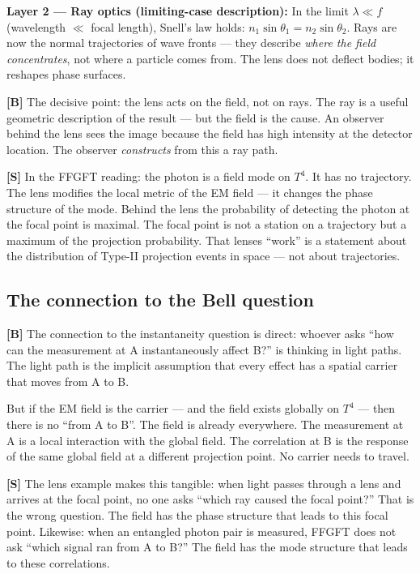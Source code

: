 \textbf{Layer 2 --- Ray optics (limiting-case description):}
In the limit $\lambda \ll f$ (wavelength $\ll$ focal length), Snell's law
holds: $n_1 \sin\theta_1 = n_2 \sin\theta_2$. Rays are now the normal
trajectories of wave fronts --- they describe \emph{where the field
concentrates}, not where a particle comes from. The lens does not deflect
bodies; it reshapes phase surfaces.

\textbf{[B]} The decisive point: the lens acts on the field, not on rays.
The ray is a useful geometric description of the result --- but the field
is the cause. An observer behind the lens sees the image because the field
has high intensity at the detector location. The observer \emph{constructs}
from this a ray path.

\textbf{[S]} In the FFGFT reading: the photon is a field mode on $T^4$.
It has no trajectory. The lens modifies the local metric of the EM field
--- it changes the phase structure of the mode. Behind the lens the
probability of detecting the photon at the focal point is maximal. The
focal point is not a station on a trajectory but a maximum of the
projection probability. That lenses ``work'' is a statement about the
distribution of Type-II projection events in space --- not about trajectories.

\subsection{The connection to the Bell question}

\textbf{[B]} The connection to the instantaneity question is direct:
whoever asks ``how can the measurement at A instantaneously affect B?''
is thinking in light paths. The light path is the implicit assumption
that every effect has a spatial carrier that moves from A to B.

But if the EM field is the carrier --- and the field exists globally on
$T^4$ --- then there is no ``from A to B''. The field is already everywhere.
The measurement at A is a local interaction with the global field. The
correlation at B is the response of the same global field at a different
projection point. No carrier needs to travel.

\textbf{[S]} The lens example makes this tangible: when light passes
through a lens and arrives at the focal point, no one asks ``which ray
caused the focal point?'' That is the wrong question. The field has the
phase structure that leads to this focal point. Likewise: when an
entangled photon pair is measured, FFGFT does not ask ``which signal
ran from A to B?'' The field has the mode structure that leads to these
correlations.

